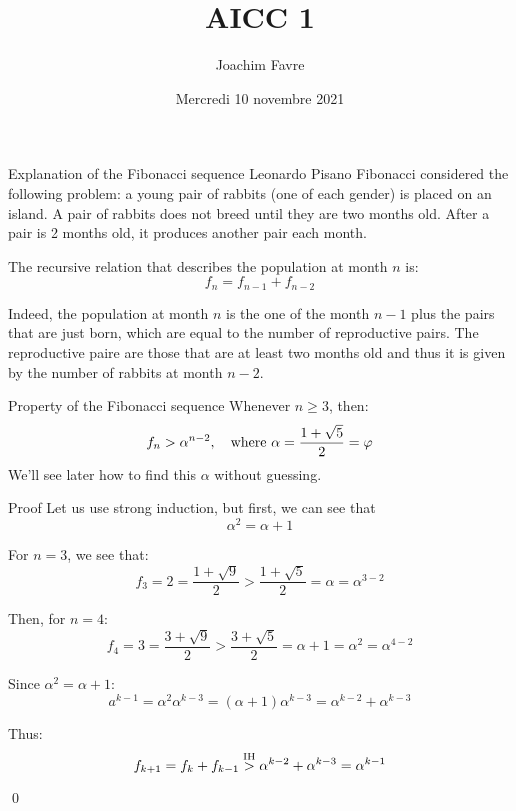 \documentclass[a4paper]{article}
\title{AICC 1}
\author{Joachim Favre}
\date{Mercredi 10 novembre 2021}
\begin{document}
\maketitle


\begin{parag}{Explanation of the Fibonacci sequence}
    Leonardo Pisano Fibonacci considered the following problem: a young pair of rabbits (one of each gender) is placed on an island. A pair of rabbits does not breed until they are two months old. After a pair is 2 months old, it produces another pair each month.

    The recursive relation that describes the population at month $n$ is:
    \[f_n = f_{n-1} + f_{n-2}\]

    Indeed, the population at month $n$ is the one of the month $n-1$ plus the pairs that are just born, which are equal to the number of reproductive pairs. The reproductive paire are those that are at least two months old and thus it is given by the number of rabbits at month $n-2$.
\end{parag}

\begin{parag}{Property of the Fibonacci sequence}
    Whenever $n \geq 3$, then: 
    \[f_n > \alpha^{n - 2}, \mathspace \text{where } \alpha = \frac{1 + \sqrt{5}}{2} = \phi\]
    We'll see later how to find this $\alpha$ without guessing.

    \begin{subparag}{Proof}
        Let us use strong induction, but first, we can see that 
        \[\alpha^2 = \alpha + 1\]

         For $n = 3$, we see that:
        \[f_3 = 2 = \frac{1 + \sqrt{9}}{2} > \frac{1 + \sqrt{5}}{2} = \alpha = \alpha^{3 - 2} \]

        Then, for $n = 4$: 
        \[f_4 = 3 = \frac{3 + \sqrt{9}}{2} > \frac{3 + \sqrt{5}}{2} = \alpha + 1 = \alpha^2 = \alpha^{4 - 2}\]
        
         Since $\alpha^2 = \alpha + 1$: 
        \[a^{k-1} = \alpha^2 \alpha ^{k - 3} = \left(\alpha + 1\right)\alpha ^{k - 3} = \alpha ^{k-2} + \alpha ^{k - 3}\]

        Thus: 
        \[f_{k+1} = f_{k} + f_{k-1} \over{>}{IH} \alpha^{k-2} + \alpha^{k-3} = \alpha ^{k-1}\]
        
        \qed
    \end{subparag}
\end{parag}
\end{document}
